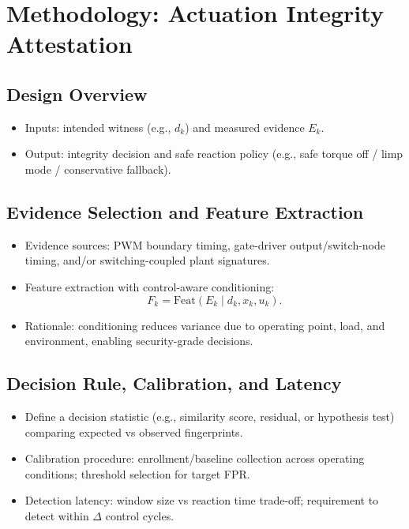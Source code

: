 \section{Methodology: Actuation Integrity Attestation}
\label{sec:methodology}
\subsection{Design Overview}
\begin{itemize}
    \item Inputs: intended witness (e.g., $d_k$) and measured evidence $E_k$.
    \item Output: integrity decision and safe reaction policy (e.g., safe torque off / limp mode / conservative fallback).
\end{itemize}

\subsection{Evidence Selection and Feature Extraction}
\begin{itemize}
    \item Evidence sources: PWM boundary timing, gate-driver output/switch-node timing, and/or switching-coupled plant signatures.
    \item Feature extraction with control-aware conditioning:
    \begin{equation}
        F_k = \mathrm{Feat}(E_k \mid d_k, x_k, u_k).
    \end{equation}
    \item Rationale: conditioning reduces variance due to operating point, load, and environment, enabling security-grade decisions.
\end{itemize}

\subsection{Decision Rule, Calibration, and Latency}
\begin{itemize}
    \item Define a decision statistic (e.g., similarity score, residual, or hypothesis test) comparing expected vs observed fingerprints.
    \item Calibration procedure: enrollment/baseline collection across operating conditions; threshold selection for target FPR.
    \item Detection latency: window size vs reaction time trade-off; requirement to detect within $\Delta$ control cycles.
\end{itemize}

